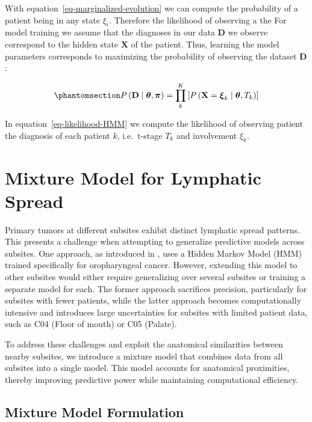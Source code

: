 \documentclass[
  sn-mathphys-num,
]{sn-jnl}
\begin{document}
With equation~\ref{eq-marginalized-evolution} we can compute the
probability of a patient being in any state \(\xi_i\). Therefore the
likelihood of observing a the For model training we assume that the
diagnoses in our data \(\mathbf{D}\) we observe correspond to the hidden
state \(\mathbf{X}\) of the patient. Thus, learning the model parameters
corresponds to maximizing the probability of observing the dataset
\(\mathbf{D}\):

\begin{equation}\phantomsection\label{eq-likelihood-HMM}{
P \left( \mathbf{D} \mid \boldsymbol{\theta}, \boldsymbol{\pi}\right) = \prod_k^K \left[P \left( \mathbf{X}=\boldsymbol{\xi}_k \mid \boldsymbol{\theta}, T_k \right) \right]
}\end{equation}

In equation~\ref{eq-likelihood-HMM} we compute the likelihood of
observing patient the diagnosis of each patient \(k\), i.e.~t-stage
\(T_k\) and involvement \(\xi_k\).

\section{Mixture Model for Lymphatic Spread}\label{sec-mixture}

Primary tumors at different subsites exhibit distinct lymphatic spread
patterns. This presents a challenge when attempting to generalize
predictive models across subsites. One approach, as introduced in
\citep{ludwig_dynamic_2021}, uses a Hidden Markov Model (HMM) trained
specifically for oropharyngeal cancer. However, extending this model to
other subsites would either require generalizing over several subsites
or training a separate model for each. The former approach sacrifices
precision, particularly for subsites with fewer patients, while the
latter approach becomes computationally intensive and introduces large
uncertainties for subsites with limited patient data, such as C04 (Floor
of mouth) or C05 (Palate).

To address these challenges and exploit the anatomical similarities
between nearby subsites, we introduce a mixture model that combines data
from all subsites into a single model. This model accounts for
anatomical proximities, thereby improving predictive power while
maintaining computational efficiency.

\subsection{Mixture Model Formulation}\label{mixture-model-formulation}
\end{document}
